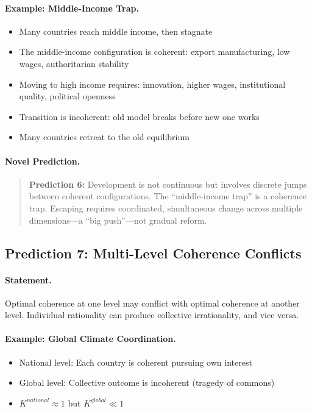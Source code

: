 \paragraph{Example: Middle-Income Trap.}
\begin{itemize}
  \item Many countries reach middle income, then stagnate
  \item The middle-income configuration is coherent: export manufacturing, 
        low wages, authoritarian stability
  \item Moving to high income requires: innovation, higher wages, 
        institutional quality, political openness
  \item Transition is incoherent: old model breaks before new one works
  \item Many countries retreat to the old equilibrium
\end{itemize}

\paragraph{Novel Prediction.}
\begin{quote}
\textbf{Prediction 6:} Development is not continuous but involves
discrete jumps between coherent configurations. The ``middle-income trap''
is a coherence trap. Escaping requires coordinated, simultaneous change
across multiple dimensions---a ``big push''---not gradual reform.
\end{quote}

\subsection{Prediction 7: Multi-Level Coherence Conflicts}

\paragraph{Statement.}
Optimal coherence at one level may conflict with optimal coherence
at another level. Individual rationality can produce collective irrationality,
and vice versa.

\paragraph{Example: Global Climate Coordination.}
\begin{itemize}
  \item National level: Each country is coherent pursuing own interest
  \item Global level: Collective outcome is incoherent (tragedy of commons)
  \item $K^{national} \approx 1$ but $K^{global} \ll 1$
\end{itemize}


